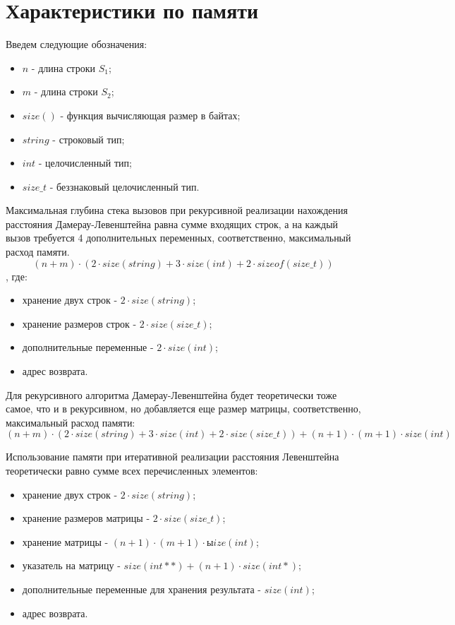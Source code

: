 \documentclass[a4paper,14pt, unknownkeysallowed]{bmstu}
\begin{document}
\section{Характеристики по памяти}

Введем следующие обозначения:
\begin{itemize}
	\item$n$ - длина строки $S_{1}$;
	\item$m$ - длина строки $S_{2}$;
	\item$size()$ - функция вычисляющая размер в байтах;
	\item $string$ - строковый тип;
	\item $int$ - целочисленный тип;
	\item $size\_t$ - беззнаковый целочисленный тип.
\end{itemize}

Максимальная глубина стека вызовов при рекурсивной реализации нахождения расстояния Дамерау-Левенштейна равна сумме входящих строк, а на каждый вызов требуется 4 дополнительных переменных, соответственно, максимальный расход памяти.
\begin{equation}
	(n + m) \cdot (2 \cdot size(string) + 3 \cdot size(int) + 2 \cdot sizeof(size\_t))
\end{equation}
, где:
\begin{itemize}
	\item хранение двух строк - $2 \cdot size(string)$;
	\item хранение размеров строк - $2 \cdot size(size\_t)$;
	\item дополнительные переменные - $2 \cdot size(int)$;
	\item адрес возврата.
\end{itemize}

Для рекурсивного алгоритма Дамерау-Левенштейна будет теоретически тоже самое, что и в рекурсивном, но добавляется еще размер матрицы, соответственно, максимальный расход памяти:
\begin{equation}
	(n + m) \cdot (2 \cdot size(string) + 3 \cdot size(int) + 2 \cdot size(size\_t)) + (n + 1) \cdot (m + 1) \cdot size(int)
\end{equation}

Использование памяти при итеративной реализации расстояния Левенштейна теоретически равно сумме всех перечисленных элементов:
\begin{itemize}
	\item хранение двух строк - $2 \cdot size(string)$;
	\item хранение размеров матрицы - $2 \cdot size(size\_t)$;
	\item хранение матрицы - $(n + 1) \cdot (m + 1) \cdot ыize(int)$;
	\item указатель на матрицу - $size(int **) + (n + 1) \cdot size(int *)$;
	\item дополнительные переменные для хранения результата - $size(int)$;
	\item адрес возврата.
\end{itemize}
\end{document}
